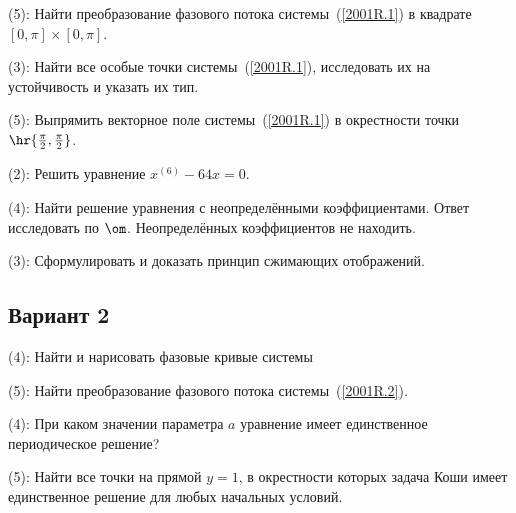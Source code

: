 \documentclass[a4paper]{article}
\newcommand{\skill}[1]{\textsf{(#1):}}
\begin{document}
\begin{problem}
\skill{5}
Найти преобразование фазового потока системы~(\ref{2001R.1}) в квадрате $[0,\pi]\times[0,\pi]$.
\end{problem}

\begin{problem}
\skill{3} Найти все особые точки системы~(\ref{2001R.1}), исследовать их на устойчивость и указать их тип.
\end{problem}

\begin{problem}
\skill{5}
Выпрямить векторное поле системы~(\ref{2001R.1}) в окрестности точки $\hr{\frac\pi2,\frac\pi2}$.
\end{problem}

\begin{problem}
\skill{2}
Решить уравнение $x^{(6)} - 64 x = 0$.
\end{problem}

\begin{problem}
\skill{4}
Найти решение уравнения
с неопределёнными коэффициентами. Ответ исследовать по $\om$.
Неопределённых коэффициентов не находить.
\end{problem}

\begin{problem}
\skill{3} Сформулировать и доказать принцип сжимающих отображений.
\end{problem}

\subsection{Вариант 2}

\begin{problem}
\skill{4}
Найти и нарисовать фазовые кривые системы
\end{problem}

\begin{problem}
\skill{5}
Найти преобразование фазового потока системы~(\ref{2001R.2}).
\end{problem}

\begin{problem}
\skill{4}
При каком значении параметра $a$ уравнение
имеет единственное периодическое решение?
\end{problem}

\begin{problem}
\skill{5}
Найти все точки на прямой $y=1$, в окрестности которых задача Коши
имеет единственное решение для любых начальных условий.
\end{problem}
\end{document}
